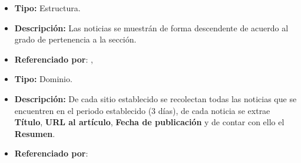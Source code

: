 \begin{itemize}
  \item \textbf{Tipo:} Estructura.
  \item \textbf{Descripción:} Las noticias se muestrán de forma descendente de acuerdo al grado de pertenencia
    a la sección.
  \item \textbf{Referenciado por}: , \\
\end{itemize}


\begin{itemize}
  \item \textbf{Tipo:} Dominio.
  \item \textbf{Descripción:} De cada sitio establecido se recolectan todas las noticias que se encuentren en el periodo 
    establecido (3 días), de cada noticia se extrae \textbf{Título}, \textbf{URL al artículo}, \textbf{Fecha de publicación} y de contar con ello el \textbf{Resumen}.

  \item \textbf{Referenciado por}:  \\
\end{itemize}
